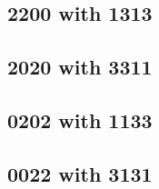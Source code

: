 \subsection{2200 with 1313}


 \begin{center}




 \end{center}



\subsection{2020 with 3311}


 \begin{center}




 \end{center}



\subsection{0202 with 1133}


 \begin{center}




 \end{center}



\subsection{0022 with 3131}

